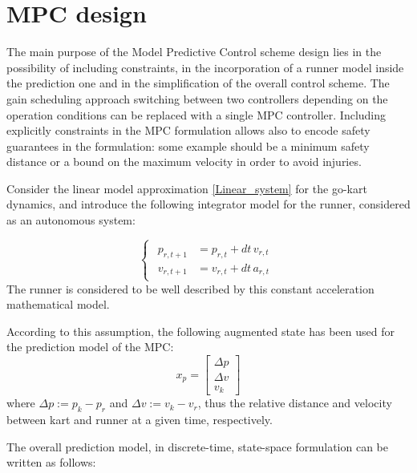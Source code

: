 \documentclass[a4paper,12pt,oneside]{book}
\begin{document}
\newpage
\newpage
\section{MPC design}
The main purpose of the Model Predictive Control scheme design lies in the possibility of including constraints, in the incorporation of a runner model inside the prediction one and in the simplification of the overall control scheme.
The gain scheduling approach switching between two controllers depending on the operation conditions can be replaced with a single MPC controller.
Including explicitly constraints in the MPC formulation allows also to encode safety guarantees in the formulation: some example should be a minimum safety distance or a bound on the maximum velocity in order to avoid injuries.

\bigskip
Consider the linear model approximation \ref{Linear_system} for the go-kart dynamics, and introduce the following integrator model for the runner, considered as an autonomous system:

\begin{equation}
\begin{cases}
	\begin{aligned}
		p_{r,t+1} &= p_{r,t} + dt \, v_{r,t} \\
		v_{r,t+1} &= v_{r,t} + dt \, a_{r,t}
	\end{aligned}
\end{cases}
\label{Runner_model}
\end{equation}
The runner is considered to be well described by this constant acceleration mathematical model.

According to this assumption, the following augmented state has been used for the prediction model of the MPC:
\begin{equation}
    x_p = 
    \begin{bmatrix}
        \Delta p  \\
        \Delta v \\
        v_k
    \end{bmatrix}
\end{equation}
where $\Delta p := p_k - p_r$ and $\Delta v := v_k - v_r$, thus the relative distance and velocity between kart and runner at a given time, respectively.

The overall prediction model, in discrete-time, state-space formulation can be written as follows:
\end{document}
